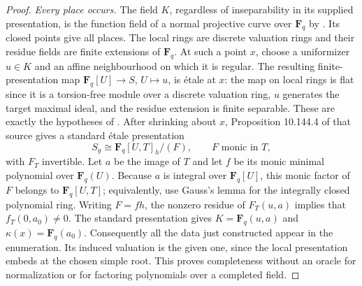 \begin{proof}
\emph{Every place occurs.}
The field $K$, regardless of inseparability in its supplied
presentation, is the function field of a normal projective
curve over $\mathbf F_q$ by
\cite[Theorem 53.2.6]{C-StacksGlobalFunctionArithmetic}.
Its closed points give all places. The local rings are
discrete valuation rings and their residue fields are finite
extensions of $\mathbf F_q$.
At such a point $x$, choose a uniformizer $u\in K$ and
an affine neighbourhood on which it is regular.
The resulting finite-presentation map
$\mathbf F_q[U]\to S$, $U\mapsto u$, is \'etale at $x$:
the map on local rings is flat since it is a torsion-free
module over a discrete valuation ring, $u$ generates the
target maximal ideal, and the residue extension is finite
separable. These are exactly the hypotheses of
\cite[Lemma 10.143.7]{C-StacksGlobalFunctionArithmetic}.
After shrinking about $x$, Proposition 10.144.4 of that
source gives a standard \'etale presentation
\[
 S_g\cong \mathbf F_q[U,T]_h/(F),
 \qquad F\text{ monic in }T,
\]
with $F_T$ invertible. Let $a$ be the image of $T$ and let
$f$ be its monic minimal polynomial over $\mathbf F_q(U)$.
Because $a$ is integral over $\mathbf F_q[U]$, this monic
factor of $F$ belongs to $\mathbf F_q[U,T]$; equivalently,
use Gauss's lemma for the integrally closed polynomial ring.
Writing $F=fh$, the nonzero residue of $F_T(u,a)$ implies
that $f_T(0,a_0)\ne0$. The standard presentation gives
$K=\mathbf F_q(u,a)$ and $\kappa(x)=\mathbf F_q(a_0)$.
Consequently all the data just constructed appear in the
enumeration. Its induced valuation is the given one, since
the local presentation embeds at the chosen simple root.
This proves completeness without an oracle for normalization
or for factoring polynomials over a completed field.
\end{proof}

